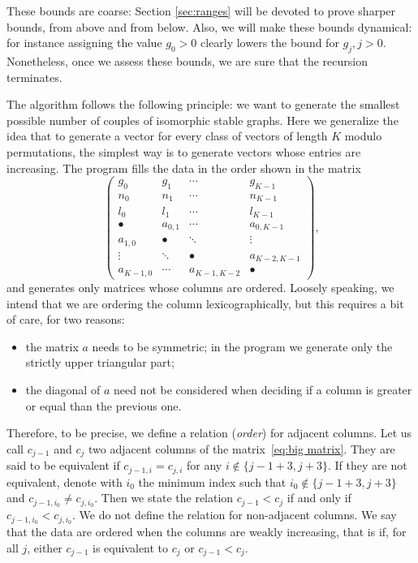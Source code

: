 \documentclass{amsart}
\theoremstyle{plain}
\theoremstyle{definition}
\begin{document}
These bounds are coarse: Section \ref{sec:ranges} will be devoted to
prove sharper bounds, from above and from below. Also, we will make
these bounds dynamical: for instance assigning the value $g_0 > 0$
clearly lowers the bound for $g_j, j > 0$. Nonetheless, once we assess
these bounds, we are sure that the recursion terminates.

The algorithm follows the following principle: we want to generate the
smallest possible number of couples of isomorphic stable graphs. Here
we generalize the idea that to generate a vector for every class of
vectors of length $K$ modulo permutations, the simplest way is to
generate vectors whose entries are increasing. The program fills the
data in the order shown in the matrix
\begin{equation}\label{eq:big matrix}
  \begin{pmatrix}
    g_0 & g_1 & \cdots & g_{K-1}\\
    n_0 & n_1 & \cdots & n_{K-1}\\
    l_0 & l_1 & \cdots & l_{K-1}\\
    \hline
    \bullet & a_{0,1} & \cdots & a_{0,K-1}\\
    a_{1,0} & \bullet & \ddots & \vdots\\
    \vdots & \ddots & \bullet & a_{K-2,K-1}\\
    a_{K-1,0} & \cdots & a_{K-1,K-2} & \bullet
  \end{pmatrix}\text{,}
\end{equation}
and generates only matrices whose columns are ordered. Loosely
speaking, we intend that we are ordering the column lexicographically,
but this requires a bit of care, for two reasons:
\begin{itemize}
\item the matrix $a$ needs to be symmetric; in the program we generate
  only the strictly upper triangular part;
\item the diagonal of $a$ need not be considered when deciding if a
  column is greater or equal than the previous one.
\end{itemize}

Therefore, to be precise, we define a relation (\emph{order}) for
adjacent columns. Let us call $c_{j-1}$ and $c_j$ two adjacent columns
of the matrix~\ref{eq:big matrix}. They are said to be equivalent if
$c_{j-1,i} = c_{j,i}$ for any $i \notin \{j-1+3, j+3\}$. If they are
not equivalent, denote with $i_0$ the minimum index such that $i_0
\notin \{ j-1+3, j+3\}$ and $c_{j-1,i_0} \neq c_{j,i_0}$. Then we
state the relation $c_{j-1} < c_j$ if and only if $c_{j-1,i_0} <
c_{j,i_0}$. We do not define the relation for non-adjacent columns.
We say that the data are ordered when the columns are weakly
increasing, that is if, for all $j$, either $c_{j-1}$ is equivalent to
$c_j$ or $c_{j-1} < c_j$.
\end{document}
